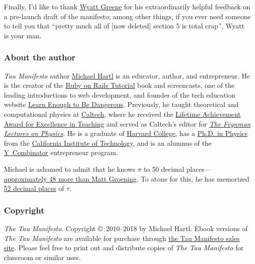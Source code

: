 Finally, I'd like to thank \href{http://techiferous.com/about}{Wyatt Greene} for his extraordinarily helpful feedback on a pre-launch draft of the manifesto; among other things, if you ever need someone to tell you that ``pretty much all of [now deleted] section 5 is total crap'', Wyatt is your man.



    \subsubsection{About the author} %
    \label{sec:about_the_author}


\emph{Tau Manifesto} author \href{http://www.michaelhartl.com/}{Michael Hartl} is an educator, author, and entrepreneur. He is the creator of the \href{http://www.railstutorial.org/}{Ruby on Rails Tutorial} book and screencasts, one of the leading introductions to web development, and founder of the tech education website \href{http://learnenough.com/}{Learn Enough to Be Dangerous}. Previously, he taught theoretical and computational physics at  \href{http://www.caltech.edu/}{Caltech}, where he received the \href{https://www.michaelhartl.com/ascit/awards2000.html}{Lifetime Achievement Award for Excellence in Teaching} and served as Caltech's editor for \href{http://www.feynmanlectures.caltech.edu/}{\emph{The Feynman Lectures on Physics}}. He is a graduate of \href{http://college.harvard.edu/}{Harvard College}, has a \href{http://thesis.library.caltech.edu/1940/}{Ph.D. in Physics} from the \href{http://www.caltech.edu/}{California Institute of Technology}, and is an alumnus of the \href{http://ycombinator.com/}{Y~Combinator} entrepreneur program.

Michael is ashamed to admit that he knows $\pi$ to 50 decimal places---\href{\#fig-futurama_video}{ap\-prox\-imately 48 more than Matt Groening}. To atone for this, he has memorized \href{http://www.wolframalpha.com/input/?i=N[2+Pi,+53]}{52 decimal places} of $\tau$.

    \subsubsection{Copyright} %
    \label{sec:copyright_and_license}

    \emph{The Tau Manifesto}. Copyright \copyright\ 2010--2018 by Michael Hartl. Ebook versions of \emph{The Tau Manifesto} are available for purchase through \href{http://sales.tauday.com/}{the Tau Manifesto sales site}. Please feel free to print out and distribute copies of \emph{The Tau Manifesto} for classroom or similar uses.

